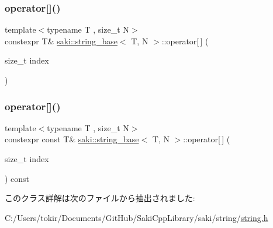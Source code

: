\subsubsection{\texorpdfstring{operator[]()}{operator[]()}\hspace{0.1cm}{\footnotesize\ttfamily [1/2]}}
{\footnotesize\ttfamily template$<$typename T , size\+\_\+t N$>$ \\
constexpr T\& \mbox{\hyperlink{classsaki_1_1string__base}{saki\+::string\+\_\+base}}$<$ T, N $>$\+::operator\mbox{[}$\,$\mbox{]} (\begin{DoxyParamCaption}\item[{size\+\_\+t}]{index }\end{DoxyParamCaption})\hspace{0.3cm}{\ttfamily [inline]}}

\mbox{\label{classsaki_1_1string__base_abfd90384f8529e8ac5cecb910000ac3b}} 
\subsubsection{\texorpdfstring{operator[]()}{operator[]()}\hspace{0.1cm}{\footnotesize\ttfamily [2/2]}}
{\footnotesize\ttfamily template$<$typename T , size\+\_\+t N$>$ \\
constexpr const T\& \mbox{\hyperlink{classsaki_1_1string__base}{saki\+::string\+\_\+base}}$<$ T, N $>$\+::operator\mbox{[}$\,$\mbox{]} (\begin{DoxyParamCaption}\item[{size\+\_\+t}]{index }\end{DoxyParamCaption}) const\hspace{0.3cm}{\ttfamily [inline]}}



このクラス詳解は次のファイルから抽出されました\+:\begin{DoxyCompactItemize}
\item 
C\+:/\+Users/tokir/\+Documents/\+Git\+Hub/\+Saki\+Cpp\+Library/saki/string/\mbox{\hyperlink{string_2string_8h}{string.\+h}}\end{DoxyCompactItemize}
